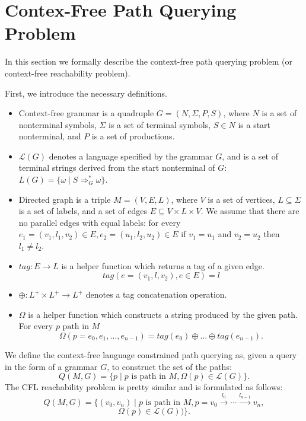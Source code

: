 \section{Contex-Free Path Querying Problem}
\label{sec:CFPQ}

In this section we formally describe the context-free path querying problem (or context-free reachability problem).


First, we introduce the necessary definitions.
\begin{itemize}
  \item Context-free grammar is a quadruple $G=(N, \Sigma, P, S)$, where $N$ is a set of nonterminal symbols, $\Sigma$ is a set of terminal symbols, $S \in N$ is a start nonterminal, and $P$ is a set of productions. 
  \item $\mathcal{L}(G)$ denotes a language specified by the grammar $G$, and is a set of terminal strings derived from the start nonterminal of $G$: $L(G) = \{\omega \mid S \Rightarrow_{G}^{*} \omega\}$.
  \item Directed graph is a triple $M = (V,E,L)$, where $V$ is a set of vertices, $L \subseteq \Sigma$ is a set of labels, and a set of edges $E\subseteq V\times L\times V$. 
  We assume that there are no parallel edges with equal labels: for every $e_1=(v_1,l_1,v_2) \in E, e_2=(u_1,l_2,u_2) \in E$ if $v_1 = u_1$ and $v_2 = u_2$ then $l_1 \neq l_2$.
  \item $tag: E \rightarrow L$ is a helper function which returns a tag of a given edge. $$tag(e = (v_1,l,v_2), e \in E) = l$$
  \item $\oplus: L^+ \times L^+ \rightarrow L^+$ denotes a tag concatenation operation.
  \item $\Omega$ is a helper function which constructs a string produced by the given path. For every $p \text{ path in } M$
  $$ \Omega(p = e_{0},e_{1},\dots,e_{n-1}) = tag (e_{0}) \oplus \dots \oplus tag (e_{n-1}).$$
\end{itemize}

We define the context-free language constrained path querying as, given a query in the form of a grammar $G$, to construct the set of the paths: $$Q(M,G)=\{p \mid p \text{ is path in } M, \Omega(p) \in \mathcal{L}(G)\}.$$
The CFL reachability problem is pretty similar and is formulated as follows: $$Q(M,G) =\{ (v_0,v_n) \mid p \text{ is path in } M, p = v_0 \xrightarrow{l_0} \cdots \xrightarrow{l_{n-1}}v_n,$$
$$ \Omega(p) \in \mathcal{L}(G))\}.$$

